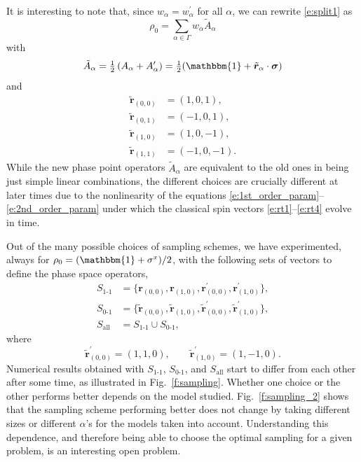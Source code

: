 \documentclass[aps,prl,showpacs,amsmath,amssymb,superscriptaddress,reprint,10pt]{revtex4-1}
\newcommand\id{{\mathbbm{1}}}
\newcommand{\mvec}[1]{\boldsymbol #1}
\begin{document}
It is interesting to note that, since $w_\alpha=w_\alpha^\prime$ for all $\alpha$, we can rewrite \eqref{e:split1} as
\begin{equation}\label{e:split2}
\rho_0 = \sum_{\alpha\in\Gamma}w_\alpha \tilde{A}_\alpha
\end{equation}
with
\begin{equation}
\tilde{A}_\alpha = \tfrac{1}{2}\left(A_\alpha + A_\alpha^\prime\right) = \tfrac{1}{2}(\id+\tilde{\mvec{r}}_\alpha\cdot\mvec{\sigma})
\end{equation}
and
\begin{subequations}
\begin{align}
\tilde{\mvec{r}}_{(0,0)}&=(1,0,1),\label{e:rt1}\\
\tilde{\mvec{r}}_{(0,1)}&=(-1,0,1),\\
\tilde{\mvec{r}}_{(1,0)}&=(1,0,-1),\\
\tilde{\mvec{r}}_{(1,1)}&=(-1,0,-1).\label{e:rt4}
\end{align}
\end{subequations}
While the new phase point operators $\tilde{A}_\alpha$ are equivalent to the old ones in being just simple linear combinations, the different choices are crucially different at later times due to the nonlinearity of the equations \eqref{e:1st_order_param}--\eqref{e:2nd_order_param} under which the classical spin vectors \eqref{e:rt1}--\eqref{e:rt4} evolve in time.

Out of the many possible choices of sampling schemes, we have experimented, always for $\rho_0 = (\id+\sigma^x)/2$, with the following sets of vectors to define the phase space operators,
\begin{subequations}
\begin{align}
S_{\text{1-1}}&=\bigl\{\mvec{r}_{(0,0)},\mvec{r}_{(1,0)},\mvec{r}_{(0,0)}^\prime,\mvec{r}_{(1,0)}^\prime\bigr\},\label{e:S11}\\
S_{\text{0-1}}&=\bigl\{\tilde{\mvec{r}}_{(0,0)},\tilde{\mvec{r}}_{(1,0)},\tilde{\mvec{r}}_{(0,0)}^\prime,\tilde{\mvec{r}}_{(1,0)}^\prime\bigr\},\\
S_{\text{all}}&=S_{\text{1-1}}\cup S_{\text{0-1}},\label{e:Sall}
\end{align}
\end{subequations}
where
\begin{equation}
\tilde{\mvec{r}}_{(0,0)}^\prime=(1,1,0),\qquad \tilde{\mvec{r}}_{(1,0)}^\prime=(1,-1,0).
\end{equation}
Numerical results obtained with $S_{\text{1-1}}$, $S_{\text{0-1}}$, and $S_{\text{all}}$ start to differ from each other after some time, as illustrated in Fig.~\ref{f:sampling}. Whether one choice or the other performs better depends on the model studied. Fig.~\ref{f:sampling_2} shows that the sampling scheme performing better does not change by taking different sizes or different $\alpha$'s for the models taken into account. Understanding this dependence, and therefore being able to choose the optimal sampling for a given problem, is an interesting open problem.
\end{document}
